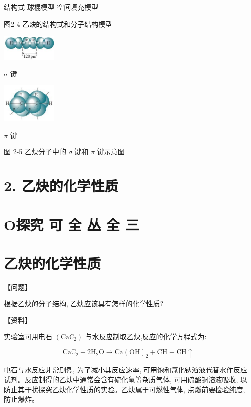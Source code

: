 \documentclass[10pt]{article}
\begin{document}
结构式 球棍模型 空间填充模型

图2-4 乙炔的结构式和分子结构模型

\begin{center}
\includegraphics[max width=0.2\textwidth]{images/0190efc5-b58a-7c43-bfb0-e0a030df9cfd_42_301141.jpg}
\end{center}

\(\sigma\) 键

\begin{center}
\includegraphics[max width=0.2\textwidth]{images/0190efc5-b58a-7c43-bfb0-e0a030df9cfd_42_244649.jpg}
\end{center}

\(\pi\) 键

图 2-5 乙炔分子中的 \(\sigma\) 键和 \(\pi\) 键示意图

\section*{2. 乙炔的化学性质}

\section*{O探究 可 全 丛 全 三}

\section*{乙炔的化学性质}

【问题】

根据乙炔的分子结构, 乙炔应该具有怎样的化学性质?

【资料】

实验室可用电石 \(\left( {\mathrm{{CaC}}}_{2}\right)\) 与水反应制取乙炔,反应的化学方程式为:

\[
{\mathrm{{CaC}}}_{2} + 2{\mathrm{H}}_{2}\mathrm{O} \rightarrow \mathrm{{Ca}}{\left( \mathrm{{OH}}\right) }_{2} + \mathrm{{CH}} \equiv \mathrm{{CH}} \uparrow
\]

电石与水反应非常剧烈, 为了减小其反应速率, 可用饱和氯化钠溶液代替水作反应试剂。反应制得的乙炔中通常会含有硫化氢等杂质气体, 可用硫酸铜溶液吸收, 以防止其干扰探究乙炔化学性质的实验。乙炔属于可燃性气体, 点燃前要检验纯度, 防止爆炸。
\end{document}
